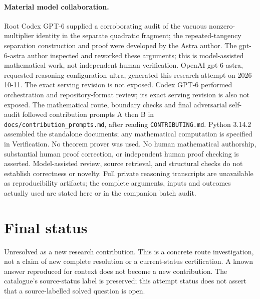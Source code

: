\documentclass[11pt]{article}
\begin{document}
\paragraph{Material model collaboration.} Root Codex GPT-6 supplied a corroborating audit of the vacuous nonzero-multiplier identity in the separate quadratic fragment; the repeated-tangency separation construction and proof were developed by the Astra author. The gpt-6-astra author inspected and reworked these arguments; this is model-assisted mathematical work, not independent human verification.
OpenAI gpt-6-astra, requested reasoning configuration ultra, generated this research
attempt on 2026-10-11. The exact serving revision is not exposed. Codex GPT-6
performed orchestration and repository-format review; its exact serving revision
is also not exposed. The mathematical route, boundary checks and final adversarial
self-audit followed contribution prompts A then B in
\texttt{docs/contribution\_prompts.md}, after reading \texttt{CONTRIBUTING.md}.
Python 3.14.2 assembled the standalone documents; any mathematical computation is
specified in Verification. No theorem prover was used. No human mathematical
authorship, substantial human proof correction, or independent human proof checking
is asserted. Model-assisted review, source retrieval, and structural checks do not
establish correctness or novelty. Full private reasoning transcripts are unavailable
as reproducibility artifacts; the complete arguments, inputs and outcomes actually
used are stated here or in the companion batch audit.
\section{Final status}
Unresolved as a new research contribution. This is a concrete route investigation,
not a claim of new complete resolution or a current-status certification. A known
answer reproduced for context does not become a new contribution. The catalogue's
source-status label is preserved; this attempt status does not assert that a
source-labelled solved question is open.
\end{document}
